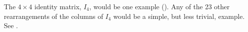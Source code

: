The $4\times 4$ identity matrix, $I_4$, would be one example ().  Any of the 23 other rearrangements of the columns of $I_4$ would be a simple, but less trivial, example.  See .
